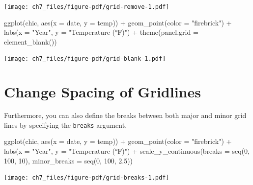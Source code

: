\documentclass[
  letterpaper,
]{scrbook}
\newenvironment{Shaded}{\begin{snugshade}}{\end{snugshade}}
\newcommand{\AttributeTok}[1]{\textcolor[rgb]{0.40,0.45,0.13}{#1}}
\newcommand{\DecValTok}[1]{\textcolor[rgb]{0.68,0.00,0.00}{#1}}
\newcommand{\FloatTok}[1]{\textcolor[rgb]{0.68,0.00,0.00}{#1}}
\newcommand{\FunctionTok}[1]{\textcolor[rgb]{0.28,0.35,0.67}{#1}}
\newcommand{\NormalTok}[1]{\textcolor[rgb]{0.00,0.23,0.31}{#1}}
\newcommand{\SpecialCharTok}[1]{\textcolor[rgb]{0.37,0.37,0.37}{#1}}
\newcommand{\StringTok}[1]{\textcolor[rgb]{0.13,0.47,0.30}{#1}}
\begin{document}
\texttt{[image: ch7\_files/figure-pdf/grid-remove-1.pdf]}

\begin{Shaded}
\begin{Highlighting}[]
\FunctionTok{ggplot}\NormalTok{(chic, }\FunctionTok{aes}\NormalTok{(}\AttributeTok{x =}\NormalTok{ date, }\AttributeTok{y =}\NormalTok{ temp)) }\SpecialCharTok{+}
  \FunctionTok{geom\_point}\NormalTok{(}\AttributeTok{color =} \StringTok{"firebrick"}\NormalTok{) }\SpecialCharTok{+}
  \FunctionTok{labs}\NormalTok{(}\AttributeTok{x =} \StringTok{"Year"}\NormalTok{, }\AttributeTok{y =} \StringTok{"Temperature (°F)"}\NormalTok{) }\SpecialCharTok{+}
  \FunctionTok{theme}\NormalTok{(}\AttributeTok{panel.grid =} \FunctionTok{element\_blank}\NormalTok{())}
\end{Highlighting}
\end{Shaded}

\texttt{[image: ch7\_files/figure-pdf/grid-blank-1.pdf]}

\section{Change Spacing of Gridlines}\label{change-spacing-of-gridlines}

Furthermore, you can also define the breaks between both major and minor
grid lines by specifying the \texttt{breaks} argument.

\begin{Shaded}
\begin{Highlighting}[]
\FunctionTok{ggplot}\NormalTok{(chic, }\FunctionTok{aes}\NormalTok{(}\AttributeTok{x =}\NormalTok{ date, }\AttributeTok{y =}\NormalTok{ temp)) }\SpecialCharTok{+}
  \FunctionTok{geom\_point}\NormalTok{(}\AttributeTok{color =} \StringTok{"firebrick"}\NormalTok{) }\SpecialCharTok{+}
  \FunctionTok{labs}\NormalTok{(}\AttributeTok{x =} \StringTok{"Year"}\NormalTok{, }\AttributeTok{y =} \StringTok{"Temperature (°F)"}\NormalTok{) }\SpecialCharTok{+}
  \FunctionTok{scale\_y\_continuous}\NormalTok{(}\AttributeTok{breaks =} \FunctionTok{seq}\NormalTok{(}\DecValTok{0}\NormalTok{, }\DecValTok{100}\NormalTok{, }\DecValTok{10}\NormalTok{),}
                     \AttributeTok{minor\_breaks =} \FunctionTok{seq}\NormalTok{(}\DecValTok{0}\NormalTok{, }\DecValTok{100}\NormalTok{, }\FloatTok{2.5}\NormalTok{))}
\end{Highlighting}
\end{Shaded}

\texttt{[image: ch7\_files/figure-pdf/grid-breaks-1.pdf]}
\end{document}

